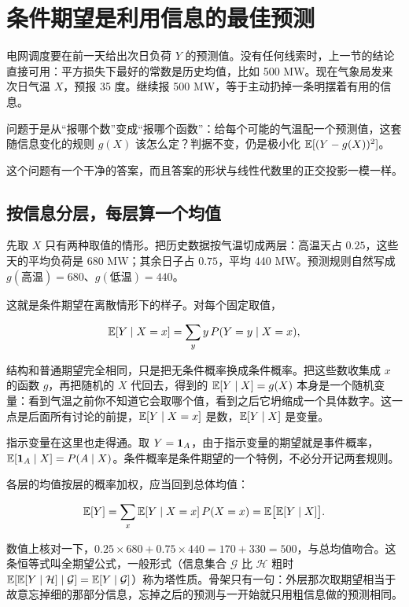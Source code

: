 \section{条件期望是利用信息的最佳预测}
\label{sec:05-Probability/04-Expectation-and-Moments/04}

电网调度要在前一天给出次日负荷 \(Y\) 的预测值。没有任何线索时，上一节的结论直接可用：平方损失下最好的常数是历史均值，比如 500 MW。现在气象局发来次日气温 \(X\)，预报 35 度。继续报 500 MW，等于主动扔掉一条明摆着有用的信息。

问题于是从``报哪个数''变成``报哪个函数''：给每个可能的气温配一个预测值，这套随信息变化的规则 \(g(X)\) 该怎么定？判据不变，仍是极小化 \(\mathbb{E}[(Y-g(X))^2]\)。

这个问题有一个干净的答案，而且答案的形状与线性代数里的正交投影一模一样。

\subsection{按信息分层，每层算一个均值}

先取 \(X\) 只有两种取值的情形。把历史数据按气温切成两层：高温天占 \(0.25\)，这些天的平均负荷是 680 MW；其余日子占 \(0.75\)，平均 440 MW。预测规则自然写成 \(g(\text{高温})=680\)、\(g(\text{低温})=440\)。

这就是条件期望在离散情形下的样子。对每个固定取值，

\[
\mathbb{E}[Y\mid X=x]=\sum_y y\,P(Y=y\mid X=x),
\]

结构和普通期望完全相同，只是把无条件概率换成条件概率。把这些数收集成 \(x\) 的函数 \(g\)，再把随机的 \(X\) 代回去，得到的 \(\mathbb{E}[Y\mid X]=g(X)\) 本身是一个随机变量：看到气温之前你不知道它会取哪个值，看到之后它坍缩成一个具体数字。这一点是后面所有讨论的前提，\(\mathbb{E}[Y\mid X=x]\) 是数，\(\mathbb{E}[Y\mid X]\) 是变量。

指示变量在这里也走得通。取 \(Y=\mathbf{1}_A\)，由于指示变量的期望就是事件概率，\(\mathbb{E}[\mathbf{1}_A\mid X]=P(A\mid X)\)。条件概率是条件期望的一个特例，不必分开记两套规则。

各层的均值按层的概率加权，应当回到总体均值：

\[
\mathbb{E}[Y]=\sum_x\mathbb{E}[Y\mid X=x]\,P(X=x)=\mathbb{E}\bigl[\mathbb{E}[Y\mid X]\bigr].
\]

数值上核对一下，\(0.25\times680+0.75\times440=170+330=500\)，与总均值吻合。这条恒等式叫全期望公式，一般形式（信息集合 \(\mathcal G\) 比 \(\mathcal H\) 粗时 \(\mathbb{E}[\mathbb{E}[Y\mid\mathcal H]\mid\mathcal G]=\mathbb{E}[Y\mid\mathcal G]\)）称为塔性质。骨架只有一句：外层那次取期望相当于故意忘掉细的那部分信息，忘掉之后的预测与一开始就只用粗信息做的预测相同。

